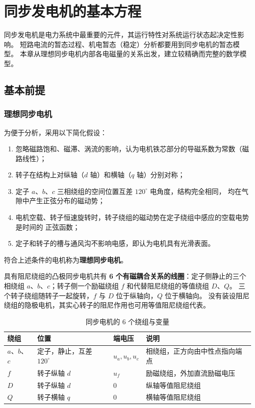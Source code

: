 ﻿%

\chapter{同步发电机的基本方程}

同步发电机是电力系统中最重要的元件，其运行特性对系统运行状态起决定性影响。
短路电流的暂态过程、机电暂态（稳定）分析都要用到同步电机的暂态模型。
本章从理想同步电机内部各电磁量的关系出发，建立较精确而完整的数学模型。

\section{基本前提}

\subsection{理想同步电机}

为便于分析，采用以下简化假设：
\begin{enumerate}
  \item 忽略磁路饱和、磁滞、涡流的影响，认为电机铁芯部分的导磁系数为常数（磁路线性）；
  \item 转子在结构上对纵轴（$d$ 轴）和横轴（$q$ 轴）分别对称；
  \item 定子 $a$、$b$、$c$ 三相绕组的空间位置互差 $120^\circ$ 电角度，结构完全相同，
        均在气隙中产生正弦分布的磁动势；
  \item 电机空载、转子恒速旋转时，转子绕组的磁动势在定子绕组中感应的空载电势是时间的
        正弦函数；
  \item 定子和转子的槽与通风沟不影响电感，即认为电机具有光滑表面。
\end{enumerate}
符合上述条件的电机称为\textbf{理想同步电机}。

具有阻尼绕组的凸极同步电机共有 \textbf{6 个有磁耦合关系的线圈}：定子侧静止的三个相绕组
$a$、$b$、$c$；转子侧一个励磁绕组 $f$ 和代替阻尼绕组的等值绕组 $D$、$Q$。
三个转子绕组随转子一起旋转，$f$ 与 $D$ 位于纵轴向，$Q$ 位于横轴向。
没有装设阻尼绕组的隐极电机，其实心转子的阻尼作用也可用等值阻尼绕组代表。

\begin{table}[htbp]
  \centering
  \caption{同步电机的 6 个绕组与变量}
  \small
  \begin{tabular}{@{}llll@{}}
    \toprule
    绕组 & 位置 & 端电压 & 说明 \\
    \midrule
    $a$、$b$、$c$ & 定子，静止，互差 $120^\circ$ & $u_a,u_b,u_c$ & 相绕组，正方向由中性点指向端点 \\
    $f$ & 转子纵轴 $d$ & $u_f$ & 励磁绕组，外加直流励磁电压 \\
    $D$ & 转子纵轴 $d$ & $0$ & 纵轴等值阻尼绕组 \\
    $Q$ & 转子横轴 $q$ & $0$ & 横轴等值阻尼绕组 \\
    \bottomrule
  \end{tabular}
\end{table}

